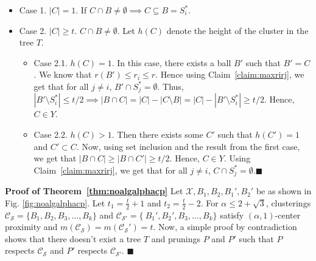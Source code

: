 \documentclass[orivec]{llncs}
\newcommand{\mc}{\mathcal}
\renewcommand{\qed}{\hfill\ensuremath{\blacksquare}}
\begin{document}
\begin{itemize}[nolistsep,leftmargin=*]
\item Case 1. $|C| = 1$. If $C \cap B \neq \emptyset \implies C \subseteq B = S_i^*$.
\item Case 2. $|C|\ge t$. $C \cap B \neq \emptyset$. Let $h(C)$ denote the height of the cluster in the tree $T$. 
\begin{itemize}[leftmargin=*]
\renewcommand\labelitemii{$\circ$}
\item Case 2.1. $h(C) = 1$. In this case, there exists a ball $B'$ such that $B' = C$. We know that $r(B') \le r_i \le r$. Hence using Claim~\ref{claim:maxrirj}, we get that for all $j \neq i$, $B' \cap S_j^* = \emptyset$. Thus, $|B'\setminus S_i^*| \le t/2 \implies |B\cap C| = |C| - |C\setminus B| = |C| - |B'\setminus S_i^*| \ge t/2$. Hence, $C \in Y$.

\item Case 2.2. $h(C) > 1$. Then there exists some $C'$ such that $h(C') = 1$ and $C' \subset C$. Now, using set inclusion and the result from the first case, we get that $|B\cap C| \ge |B\cap C'| \ge t/2$. Hence, $C \in Y$. Using Claim~\ref{claim:maxrirj}, we get that for all $j \neq i$, $C \cap S_j^* = \emptyset$.\qed\\
\end{itemize} 
\end{itemize}


\noindent\textbf{Proof of Theorem~\ref{thm:noalgalphacp}}
Let $\mc X, B_1, B_2, B_1', B_2'$ be as shown in Fig. \ref{fig:noalgalphacp}. Let $t_1 = \frac{t}{2}+1$ and $t_2 = \frac{t}{2}-2$. For $\alpha \le 2+\sqrt{3}$, clusterings $\mc C_{\mc S} = \{B_1, B_2, B_3, \ldots, B_k\}$ and $\mc C_{\mc S'} = \{\ B_1', B_2', B_3, \ldots, B_k\}$ satisfy $(\alpha, 1)$-center proximity and $m(\mc C_{\mc S}) = m(\mc C_{\mc S}') = t$. Now, a simple proof by contradiction shows that there doesn't exist a tree $T$ and prunings $P$ and $P'$ such that $P$ respects $\mc C_{\mc S}$ and $P'$ respects $\mc C_{\mc S'}$. \qed\\
\end{document}

